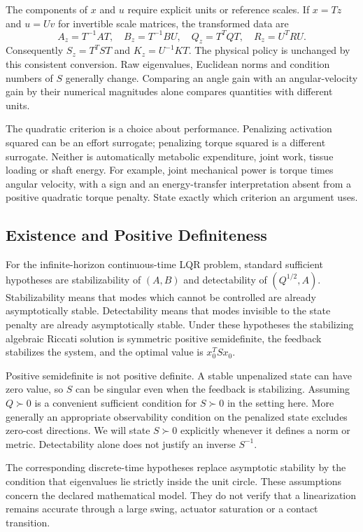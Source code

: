 The components of $x$ and $u$ require explicit units or reference scales. If $x=Tz$ and $u=Uv$ for invertible scale matrices, the transformed data are
\begin{equation}
A_z=T^{-1}AT,\quad B_z=T^{-1}BU,\quad
Q_z=T^TQT,\quad R_z=U^TRU.
\end{equation}
Consequently $S_z=T^TST$ and $K_z=U^{-1}KT$. The physical policy is unchanged by this consistent conversion. Raw eigenvalues, Euclidean norms and condition numbers of $S$ generally change. Comparing an angle gain with an angular-velocity gain by their numerical magnitudes alone compares quantities with different units.

The quadratic criterion is a choice about performance. Penalizing activation squared can be an effort surrogate; penalizing torque squared is a different surrogate. Neither is automatically metabolic expenditure, joint work, tissue loading or shaft energy. For example, joint mechanical power is torque times angular velocity, with a sign and an energy-transfer interpretation absent from a positive quadratic torque penalty. State exactly which criterion an argument uses.

\subsection{Existence and Positive Definiteness}

For the infinite-horizon continuous-time LQR problem, standard sufficient hypotheses are stabilizability of $(A,B)$ and detectability of $(Q^{1/2},A)$. Stabilizability means that modes which cannot be controlled are already asymptotically stable. Detectability means that modes invisible to the state penalty are already asymptotically stable. Under these hypotheses the stabilizing algebraic Riccati solution is symmetric positive semidefinite, the feedback stabilizes the system, and the optimal value is $x_0^TSx_0$.

Positive semidefinite is not positive definite. A stable unpenalized state can have zero value, so $S$ can be singular even when the feedback is stabilizing. Assuming $Q\succ0$ is a convenient sufficient condition for $S\succ0$ in the setting here. More generally an appropriate observability condition on the penalized state excludes zero-cost directions. We will state $S\succ0$ explicitly whenever it defines a norm or metric. Detectability alone does not justify an inverse $S^{-1}$.

The corresponding discrete-time hypotheses replace asymptotic stability by the condition that eigenvalues lie strictly inside the unit circle. These assumptions concern the declared mathematical model. They do not verify that a linearization remains accurate through a large swing, actuator saturation or a contact transition.

